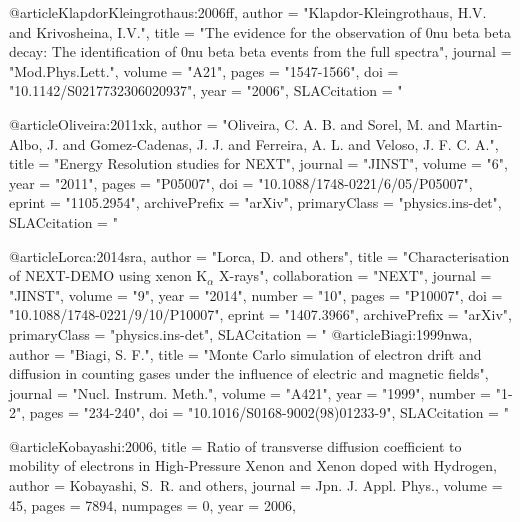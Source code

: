 @article{KlapdorKleingrothaus:2006ff,
      author         = "Klapdor-Kleingrothaus, H.V. and Krivosheina, I.V.",
      title          = "{The evidence for the observation of 0nu beta beta decay:
                        The identification of 0nu beta beta events from the full
                        spectra}",
      journal        = "Mod.Phys.Lett.",
      volume         = "A21",
      pages          = "1547-1566",
      doi            = "10.1142/S0217732306020937",
      year           = "2006",
      SLACcitation   = "%
}

@article{Oliveira:2011xk,
      author         = "Oliveira, C. A. B. and Sorel, M. and Martin-Albo, J. and
                        Gomez-Cadenas, J. J. and Ferreira, A. L. and Veloso, J. F.
                        C. A.",
      title          = "{Energy Resolution studies for NEXT}",
      journal        = "JINST",
      volume         = "6",
      year           = "2011",
      pages          = "P05007",
      doi            = "10.1088/1748-0221/6/05/P05007",
      eprint         = "1105.2954",
      archivePrefix  = "arXiv",
      primaryClass   = "physics.ins-det",
      SLACcitation   = "%
}

@article{Lorca:2014sra,
      author         = "Lorca, D. and others",
      title          = "{Characterisation of NEXT-DEMO using xenon K$_{\alpha}$
                        X-rays}",
      collaboration  = "NEXT",
      journal        = "JINST",
      volume         = "9",
      year           = "2014",
      number         = "10",
      pages          = "P10007",
      doi            = "10.1088/1748-0221/9/10/P10007",
      eprint         = "1407.3966",
      archivePrefix  = "arXiv",
      primaryClass   = "physics.ins-det",
      SLACcitation   = "%
}
@article{Biagi:1999nwa,
      author         = "Biagi, S. F.",
      title          = "{Monte Carlo simulation of electron drift and diffusion
                        in counting gases under the influence of electric and
                        magnetic fields}",
      journal        = "Nucl. Instrum. Meth.",
      volume         = "A421",
      year           = "1999",
      number         = "1-2",
      pages          = "234-240",
      doi            = "10.1016/S0168-9002(98)01233-9",
      SLACcitation   = "%
}

@article{Kobayashi:2006,
  title = {Ratio of transverse diffusion coefficient to mobility of electrons in High-Pressure
Xenon and Xenon doped with Hydrogen},
  author = {Kobayashi, S.~R. and others},
  journal = {Jpn. J. Appl. Phys.},
  volume = {45},
  pages = {7894},
  numpages = {0},
  year = {2006},
}


